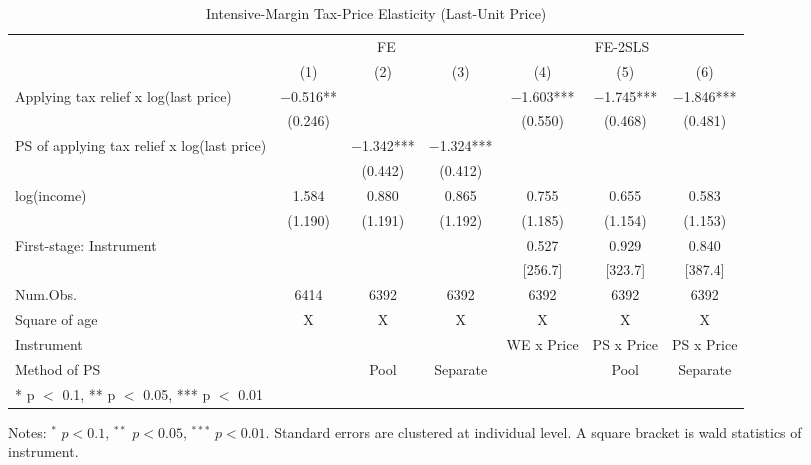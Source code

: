 \documentclass[
  11pt,
  a4paper,
]{article}
\begin{document}
\begin{table}[!h]

\caption{\label{tab:LastIntensive}Intensive-Margin Tax-Price Elasticity (Last-Unit Price)}
\centering
\fontsize{8}{10}\selectfont
\begin{threeparttable}
\begin{tabular}[t]{lcccccc}
\toprule
\multicolumn{1}{c}{ } & \multicolumn{3}{c}{FE} & \multicolumn{3}{c}{FE-2SLS} \\
\cmidrule(l{3pt}r{3pt}){2-4} \cmidrule(l{3pt}r{3pt}){5-7}
  & (1) & (2) & (3) & (4) & (5) & (6)\\
\midrule
Applying tax relief x log(last price) & \num{-0.516}** &  &  & \num{-1.603}*** & \num{-1.745}*** & \num{-1.846}***\\
 & (\num{0.246}) &  &  & (\num{0.550}) & (\num{0.468}) & (\num{0.481})\\
PS of applying tax relief x log(last price) &  & \num{-1.342}*** & \num{-1.324}*** &  &  & \\
 &  & (\num{0.442}) & (\num{0.412}) &  &  & \\
log(income) & \num{1.584} & \num{0.880} & \num{0.865} & \num{0.755} & \num{0.655} & \num{0.583}\\
 & (\num{1.190}) & (\num{1.191}) & (\num{1.192}) & (\num{1.185}) & (\num{1.154}) & (\num{1.153})\\
\midrule
First-stage: Instrument &  &  &  & 0.527 & 0.929 & 0.840\\
 &  &  &  & [256.7] & [323.7] & [387.4]\\
Num.Obs. & \num{6414} & \num{6392} & \num{6392} & \num{6392} & \num{6392} & \num{6392}\\
Square of age & X & X & X & X & X & X\\
Instrument &  &  &  & WE x Price & PS x Price & PS x Price\\
Method of PS &  & Pool & Separate &  & Pool & Separate\\
\bottomrule
\multicolumn{7}{l}{\rule{0pt}{1em}* p $<$ 0.1, ** p $<$ 0.05, *** p $<$ 0.01}\\
\end{tabular}
\begin{tablenotes}
\item Notes: $^{*}$ $p < 0.1$, $^{**}$ $p < 0.05$, $^{***}$ $p < 0.01$. Standard errors are clustered at individual level. A square bracket is wald statistics of instrument.
\end{tablenotes}
\end{threeparttable}
\end{table}
\end{document}
